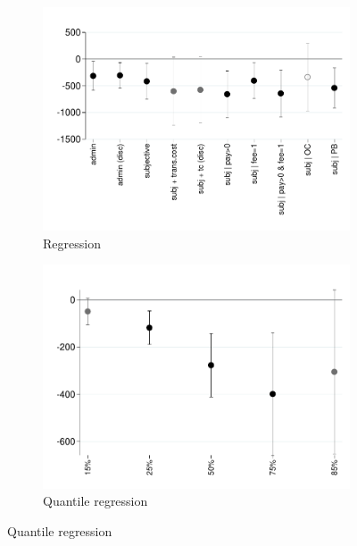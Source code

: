 \documentclass[11pt]{article}
\begin{document}
\begin{figure}[H]
    \caption{Financial cost}
    \label{fc}
    \begin{center}
    \begin{subfigure}{0.45\textwidth}
        \caption{Regression}
        \centering
        \includegraphics[width=\textwidth]{Figuras/fc_te.pdf}
    \end{subfigure}
        \begin{subfigure}{0.45\textwidth}
        \caption{Quantile regression}
        \centering
        \includegraphics[width=\textwidth]{Figuras/fc_admin quantile.pdf}
    \end{subfigure}
    \end{center}
\end{figure}
\end{document}
